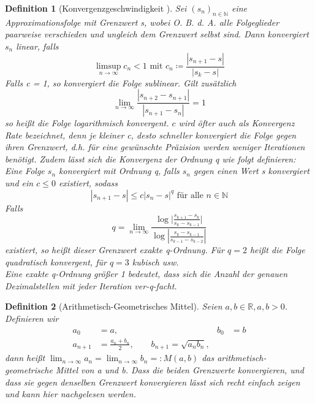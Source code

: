 \documentclass{scrartcl}
\newtheorem{definition}{Definition}
\theoremstyle{definition}
\newtheorem{approximation sequence}{Annäherungsfolge}
\begin{document}
\begin{definition}[Konvergenzgeschwindigkeit \cite{Konvergenzgeschwindigkeit}]
    Sei \((s_n)_{n \in \mathbb{N}}\) eine Approximationsfolge mit Grenzwert s,
    wobei O. B. d. A. alle Folgeglieder paarweise verschieden und ungleich dem
    Grenzwert selbst sind. Dann konvergiert \(s_n\) linear, falls
    \begin{equation*}
        \limsup_{n \to \infty} c_n < 1 \text{ mit } c_n \coloneq \frac{|s_{n+1}-s|}{|s_k-s|}
    \end{equation*}
    Falls c = 1, so konvergiert die Folge sublinear. Gilt zusätzlich
    \begin{equation*}
        \lim_{n \to \infty} \frac{|s_{n+2}-s_{n+1}|}{|s_{n+1}-s_n|} = 1
    \end{equation*}
    so heißt die Folge logarithmisch konvergent. \(c\) wird öfter auch als
    Konvergenz Rate bezeichnet, denn je kleiner c, desto schneller konvergiert
    die Folge gegen ihren Grenzwert, d.h. für eine gewünschte Präzision werden
    weniger Iterationen benötigt. Zudem lässt sich die Konvergenz der Ordnung q
    wie folgt definieren: Eine Folge \(s_n\) konvergiert mit Ordnung q, falls
    \(s_n\) gegen einen Wert s konvergiert und ein \(c \le 0\) existiert,
    sodass
    \begin{equation*}
        |s_{n+1} - s| \leqslant c|s_n - s|^q \text{ für alle } n \in \mathbb{N}
    \end{equation*}
    Falls
    \begin{equation*}
        q = \lim_{n \to \infty} \frac{\log|{\frac{s_{k+1} - s_k}{s_k - s_{k-1}}|}}{\log{|\frac{s_k - s_{k-1}}{s_{k-1} - s_{k-2}}|}}
    \end{equation*}
    existiert, so heißt dieser Grenzwert exakte q-Ordnung. Für \(q = 2\) heißt
    die Folge quadratisch konvergent, für \(q = 3 \) kubisch usw. \\ Eine
    exakte q-Ordnung größer 1 bedeutet, dass sich die Anzahl der genauen
    Dezimalstellen mit jeder Iteration ver-q-facht.
\end{definition}

\begin{definition}[Arithmetisch-Geometrisches Mittel]
    Seien \(a, b \in \mathbb{R}, a,b > 0\). Definieren wir
    \begin{align*}
        a_0     & = a,                                                    & b_0 & = b \\
        a_{n+1} & = \frac{a_n + b_n}{2}, \qquad b_{n+1} = \sqrt{a_n b_n},
    \end{align*}
    dann heißt \(\lim_{n \to \infty} a_n = \lim_{n \to \infty} b_n =: M(a,b)\)
    das arithmetisch-geometrische Mittel von a und b. Dass die beiden
    Grenzwerte konvergieren, und dass sie gegen denselben Grenzwert
    konvergieren lässt sich recht einfach zeigen und kann hier \cite{AGM}
    nachgelesen werden.
\end{definition}
\end{document}
